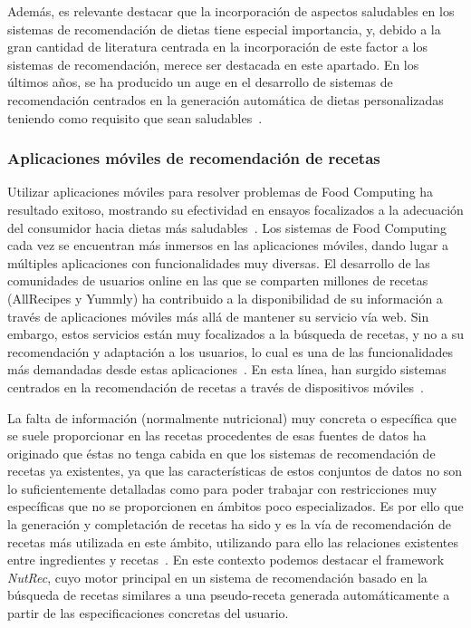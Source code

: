 Además, es relevante destacar que la incorporación de aspectos saludables en los sistemas de recomendación de dietas tiene especial importancia, y, debido a la gran cantidad de literatura centrada en la incorporación de este factor a los sistemas de recomendación, merece ser destacada en este apartado. En los últimos años, se ha producido un auge en el desarrollo de sistemas de recomendación centrados en la generación automática de dietas personalizadas teniendo como requisito que sean saludables~\cite{burilo2019nutricion,Trattner2017}. 



\subsubsection{Aplicaciones móviles de recomendación de recetas}

Utilizar aplicaciones móviles para resolver problemas de Food Computing ha resultado exitoso, mostrando su efectividad en ensayos focalizados a la adecuación del consumidor hacia dietas más saludables~\cite{ipjian2017smartphone}. Los sistemas de Food Computing cada vez se encuentran más inmersos en las aplicaciones móviles, dando lugar a múltiples aplicaciones con funcionalidades muy diversas. El desarrollo de las comunidades de usuarios online en las que se comparten millones de recetas (AllRecipes y Yummly) ha contribuido a la disponibilidad de su información a través de aplicaciones móviles más allá de mantener su servicio vía web. Sin embargo, estos servicios están muy focalizados a la búsqueda de recetas, y no a su recomendación y adaptación a los usuarios, lo cual es una de las funcionalidades más demandadas desde estas aplicaciones~\cite{chen2019eating}. En esta línea, han surgido sistemas centrados en la recomendación de recetas a través de dispositivos móviles~\cite{cheng2014content,johnson2014mobile,ketmaneechairat2017recommender,maruyama2012real}. 

La falta de información (normalmente nutricional) muy concreta o específica que se suele proporcionar en las recetas procedentes de esas fuentes de datos ha originado que éstas no tenga cabida en que los sistemas de recomendación de recetas ya existentes, ya que las características de estos conjuntos de datos no son lo suficientemente detalladas como para poder trabajar con restricciones muy específicas que no se proporcionen en ámbitos poco especializados. Es por ello que la generación y completación de recetas ha sido y es la vía de recomendación de recetas más utilizada en este ámbito, utilizando para ello las relaciones existentes entre ingredientes y recetas~\cite{de2016data}. En este contexto podemos destacar el framework \textit{NutRec}, cuyo motor principal en un sistema de recomendación basado en la búsqueda de recetas similares a una pseudo-receta generada automáticamente a partir de las especificaciones concretas del usuario.

